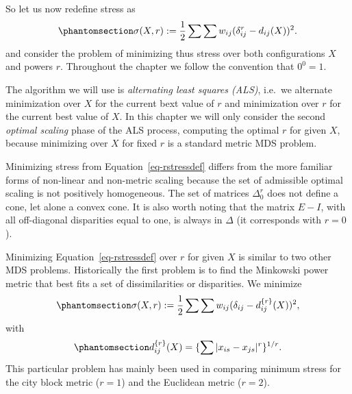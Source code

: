 \documentclass[
  12pt,
  letterpaper,
  DIV=11,
  numbers=noendperiod]{scrartcl}
\begin{document}
So let us now redefine stress as
\begin{equation}\phantomsection\label{eq-rstressdef}{
\sigma(X, r):=\frac12\sum\sum w_{ij}(\delta_{ij}^r-d_{ij}(X))^2.
}\end{equation} and consider the problem of minimizing thus stress over
both configurations \(X\) and powers \(r\). Throughout the chapter we
follow the convention that \(0^0=1\).

The algorithm we will use is \emph{alternating least squares (ALS)},
i.e.~we alternate minimization over \(X\) for the current bext value of
\(r\) and minimization over \(r\) for the current best value of \(X\).
In this chapter we will only consider the second \emph{optimal scaling}
phase of the ALS process, computing the optimal \(r\) for given \(X\),
because minimizing over \(X\) for fixed \(r\) is a standard metric MDS
problem.

Minimizing stress from Equation~\ref{eq-rstressdef} differs from the
more familiar forms of non-linear and non-metric scaling because the set
of admissible optimal scaling is not positively homogeneous. The set of
matrices \(\Delta_0^r\) does not define a cone, let alone a convex cone.
It is also worth noting that the matrix \(E-I\), with all off-diagonal
disparities equal to one, is always in \(\Delta\) (it corresponds with
\(r=0\)).

Minimizing Equation~\ref{eq-rstressdef} over \(r\) for given \(X\) is
similar to two other MDS problems. Historically the first problem is to
find the Minkowski power metric that best fits a set of dissimilarities
or disparities. We minimize
\begin{equation}\phantomsection\label{eq-mstressdef}{
\sigma(X,r):=\frac12\sum\sum w_{ij}(\delta_{ij}-d_{ij}^{\{r\}}(X))^2,
}\end{equation} with
\begin{equation}\phantomsection\label{eq-minkovski}{
d_{ij}^{\{r\}}(X)=\{\sum|x_{is}-x_{js}|^r\}^{1/r}.
}\end{equation} This particular problem has mainly been used in
comparing minimum stress for the city block metric (\(r=1\)) and the
Euclidean metric (\(r=2\)).
\end{document}
